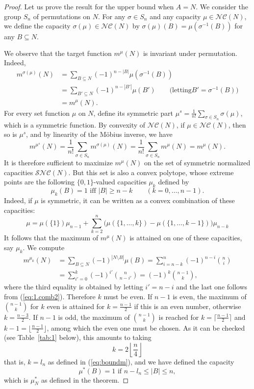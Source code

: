 \documentclass[12pt,a4paper]{article}
\theoremstyle{definition}
\theoremstyle{remark}
\def \NC {\mathscr{NC}}
\def \SNC {\mathscr{SNC}}
\begin{document}
\begin{proof}
Let us prove the result for the upper bound when $A=N$.
 We consider the group $S_n$ of permutations on $N$. For any $\sigma\in S_n$
and any capacity $\mu\in \NC(N)$, we define the capacity $\sigma(\mu)\in \NC(N)$ by
$\sigma(\mu)(B) = \mu(\sigma^{-1}(B))$ for any $B\subseteq N$.

We observe that the target function $m^\mu(N)$ is invariant under
permutation. Indeed, 
\begin{align*}
m^{\sigma(\mu)}(N)  &= \sum_{B\subseteq N}(-1)^{n-|B|}\mu(\sigma^{-1}(B))\\
 & = \sum_{B'\subseteq N}(-1)^{n-|B'|}\mu(B') \qquad \text{(letting
}B'=\sigma^{-1}(B))\\
 & = m^\mu(N).
\end{align*}
For every set function $\mu$ on $N$, define its symmetric part $\mu^s =
\frac{1}{n!}\sum_{\sigma\in S_n}\sigma(\mu)$, which is a symmetric function. By
convexity of $\NC(N)$, if $\mu\in\NC(N)$, then so is $\mu^s$, and by linearity
of the M\"obius inverse, we have
\[
m^{\mu^s}(N) = \frac{1}{n!}\sum_{\sigma\in S_n}m^{\sigma(\mu)}(N) =
\frac{1}{n!}\sum_{\sigma\in S_n}m^\mu(N) = m^\mu(N).
\]
It is therefore sufficient to maximize $m^\mu(N)$ on the set of symmetric
normalized capacities $\SNC(N)$. But this set is also a convex polytope, whose
extreme points are the following $\{0,1\}$-valued capacities
$\mu_k$ defined by
\[
\mu_k(B) = 1 \text{ iff } |B|\geqslant n-k \qquad (k=0,\ldots, n-1).
\]
Indeed, if $\mu$ is symmetric, it can be written as a convex combination of
these capacities:
\[
\mu = \mu(\{1\})\mu_{n-1} + \sum_{k=2}^n\big(\mu(\{1,\ldots, k\}) -
\mu(\{1,\ldots, k-1\})\big)\mu_{n-k}
\]
It follows that the maximum of $m^\mu(N)$ is attained on one of these
capacities, say $\mu_k$. We compute
\begin{align}
m^{\mu_k}(N) & = \sum_{B\subseteq N}(-1)^{|N\setminus B|}\mu(B)
=\sum_{i=n-k}^n(-1)^{n-i}\binom{n}{i}\nonumber\\
 & = \sum_{i'=0}^k(-1)^{i'}\binom{n}{n-i'} = (-1)^{k}\binom{n-1}{k},\label{eq:boundm1}
\end{align}
where the third equality is obtained by letting $i'=n-i$ and the last one
follows from (\ref{eq:1.comb2}). 
Therefore $k$ must be even.  If $n-1$ is even, the maximum of $\binom{n-1}{k}$
for $k$ even is attained for $k=\frac{n-1}{2}$ if this is an even number,
otherwise $k=\frac{n-3}{2}$. If $n-1$ is odd, the maximum of $\binom{n-1}{k}$ is
reached for $k=\lceil\frac{n-1}{2}\rceil$ and $k-1=\lfloor\frac{n-1}{2}\rfloor$,
among which the even one must be chosen. As it can be checked (see
Table~\ref{tab:1} below), this amounts to taking
\[
k = 2\left\lfloor \frac{n}{4}\right\rfloor
\]
that is, $k=l_n$ as defined in (\ref{eq:boundm}), and we have defined the capacity
\[
\mu^*(B) = 1\text{ if } n-l_{n}\leqslant |B|\leqslant n,
\]
which is $\mu^*_N$ as defined in the theorem.



\end{proof}
\end{document}

